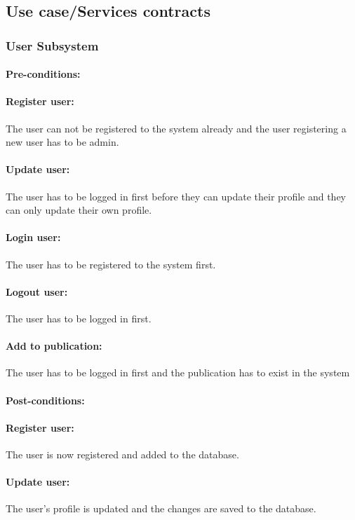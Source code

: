 \documentclass{article}
\begin{document}
		\subsection{Use case/Services contracts}
			\subsubsection{User Subsystem}
				\paragraph{Pre-conditions:}
				\paragraph{Register user:} The user can not be registered to the system already and the user registering a new user has to be admin.
				\paragraph{Update user:} The user has to be logged in first before they can update their profile and they can only update their own profile.
				\paragraph{Login user:} The user has to be registered to the system first.
				\paragraph{Logout user:} The user has to be logged in first.
				\paragraph{Add to publication:} The user has to be logged in first and the publication has to exist in the system
				\paragraph{Post-conditions:}
				\paragraph{Register user:} The user is now registered and added to the database.
				\paragraph{Update user:} The user's profile is updated and the changes are saved to the database.
\end{document}
